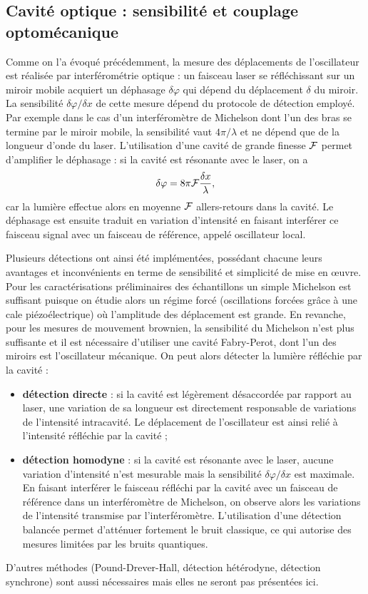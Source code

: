 \documentclass[12pt,a4paper]{article}
\begin{document}
\subsection{Cavité optique : sensibilité et couplage optomécanique}

Comme on l'a évoqué précédemment, la mesure des déplacements de l'oscillateur est réalisée par interférométrie optique : un faisceau laser se réfléchissant sur un miroir mobile acquiert un déphasage $\delta\varphi$ qui dépend du déplacement $\delta$ du miroir.
La sensibilité $\delta\varphi / \delta x$ de cette mesure dépend du protocole de détection employé.
Par exemple dans le cas d'un interféromètre de Michelson dont l'un des bras se termine par le miroir mobile, la sensibilité vaut $4\pi/\lambda$ et ne dépend que de la longueur d'onde du laser.
L'utilisation d'une cavité de grande finesse $\cal{F}$ permet d'amplifier le déphasage : si la cavité est résonante avec le laser, on a
\begin{equation}
\delta \varphi = 8\pi{\cal{F}}\frac{\delta x}{\lambda},
\end{equation}
car la lumière effectue alors en moyenne ${\cal{F}}$ allers-retours dans la cavité.
Le déphasage est ensuite traduit en variation d'intensité en faisant interférer ce faisceau signal avec un faisceau de référence, appelé oscillateur local.

Plusieurs détections ont ainsi été implémentées, possédant chacune leurs avantages et inconvénients en terme de sensibilité et simplicité de mise en œuvre.
Pour les caractérisations préliminaires des échantillons un simple Michelson est suffisant puisque on étudie alors un régime forcé (oscillations forcées grâce à une cale piézoélectrique) où l'amplitude des déplacement est grande.
En revanche, pour les mesures de mouvement brownien, la sensibilité du Michelson n'est plus suffisante et il est nécessaire d'utiliser une cavité Fabry-Perot, dont l'un des miroirs est l'oscillateur mécanique.
On peut alors détecter la lumière réfléchie par la cavité :
\begin{itemize}
\item \textbf{détection directe} : si la cavité est légèrement désaccordée par rapport au laser, une variation de sa longueur est directement responsable de variations de l'intensité intracavité.
Le déplacement de l'oscillateur est ainsi relié à l'intensité réfléchie par la cavité ;
\item \textbf{détection homodyne} : si la cavité est résonante avec le laser, aucune variation d'intensité n'est mesurable mais la sensibilité $\delta\varphi/\delta x$ est maximale.
En faisant interférer le faisceau réfléchi par la cavité avec un faisceau de référence dans un interféromètre de Michelson, on observe alors les variations de l'intensité transmise par l'interféromètre.
L'utilisation d'une détection balancée permet d'atténuer fortement le bruit classique, ce qui autorise des mesures limitées par les bruits quantiques. 
\end{itemize}
D'autres méthodes (Pound-Drever-Hall, détection hétérodyne, détection synchrone) sont aussi nécessaires mais elles ne seront pas présentées ici.
\end{document}
